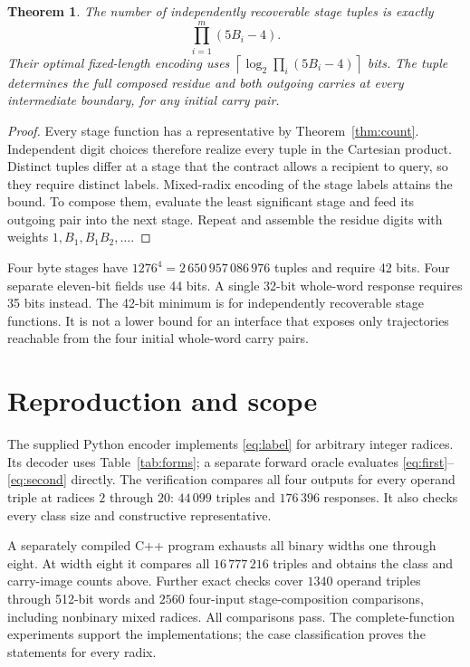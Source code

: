 \documentclass[11pt,a4paper]{article}
\newtheorem{theorem}{Theorem}
\theoremstyle{definition}\newtheorem{definition}[theorem]{Definition}
\begin{document}
\begin{theorem}\label{thm:stages}
The number of independently recoverable stage tuples is exactly
\[
 \prod_{i=1}^{m}(5B_i-4).
\]
Their optimal fixed-length encoding uses
$\left\lceil\log_2\prod_i(5B_i-4)\right\rceil$ bits.
The tuple determines the full composed residue and both outgoing
carries at every intermediate boundary, for any initial carry pair.
\end{theorem}
\begin{proof}
Every stage function has a representative by
Theorem~\ref{thm:count}. Independent digit choices therefore realize
every tuple in the Cartesian product. Distinct tuples differ at a
stage that the contract allows a recipient to query, so they require
distinct labels. Mixed-radix encoding of the stage labels attains the
bound. To compose them, evaluate the least significant stage and feed
its outgoing pair into the next stage. Repeat and assemble the residue
digits with weights $1,B_1,B_1B_2,\ldots$.
\end{proof}

Four byte stages have $1276^4=2\,650\,957\,086\,976$ tuples and
require 42 bits. Four separate eleven-bit fields use 44 bits.
A single 32-bit whole-word response requires 35 bits instead.
The 42-bit minimum is for independently recoverable stage functions.
It is not a lower bound for an interface that exposes only trajectories
reachable from the four initial whole-word carry pairs.

\section{Reproduction and scope}
The supplied Python encoder implements \eqref{eq:label} for arbitrary
integer radices. Its decoder uses Table~\ref{tab:forms}; a separate
forward oracle evaluates \eqref{eq:first}--\eqref{eq:second} directly.
The verification compares all four outputs for every operand triple
at radices $2$ through $20$: $44\,099$ triples and $176\,396$ responses.
It also checks every class size and constructive representative.

A separately compiled C++ program exhausts all binary widths one
through eight. At width eight it compares all $16\,777\,216$ triples
and obtains the class and carry-image counts above. Further exact
checks cover $1340$ operand triples through 512-bit words and $2560$
four-input stage-composition comparisons, including nonbinary mixed
radices. All comparisons pass. The complete-function experiments
support the implementations; the case classification proves the
statements for every radix.
\end{document}
